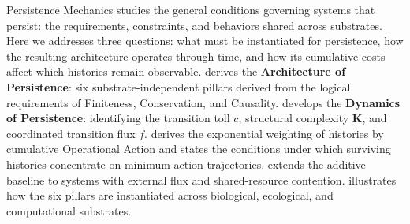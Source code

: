 Persistence Mechanics studies the general conditions governing systems that persist: the requirements, constraints, and behaviors shared across substrates. Here we addresses three questions: what must be instantiated for persistence, how the resulting architecture operates through time, and how its cumulative costs affect which histories remain observable.  derives the \textbf{Architecture of Persistence}: six substrate-independent pillars derived from the logical requirements of Finiteness, Conservation, and Causality.  develops the \textbf{Dynamics of Persistence}: identifying the transition toll $c$, structural complexity $\mathbf{K}$, and coordinated transition flux $f$.  derives the exponential weighting of histories by cumulative Operational Action and states the conditions under which surviving histories concentrate on minimum-action trajectories.  extends the additive baseline to systems with external flux and shared-resource contention.  illustrates how the six pillars are instantiated across biological, ecological, and computational substrates.
